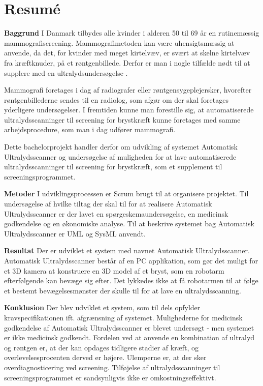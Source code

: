 \chapter{Resumé}
\textbf{Baggrund} \newline
I Danmark tilbydes alle kvinder i alderen 50 til 69 år en rutinemæssig mammografiscreening. Mammografimetoden kan være uhensigtsmæssig at anvende, da det, for kvinder med meget kirtelvæv, er svært at skelne kirtelvæv fra kræftknuder, på et røntgenbillede. Derfor er man i nogle tilfælde nødt til at supplere med en ultralydsundersøgelse \cite{Ultralyd}.

Mammografi foretages i dag af radiografer eller røntgensygeplejersker, hvorefter røntgenbillederne sendes til en radiolog, som afgør om der skal foretages yderligere undersøgelser. I fremtiden kunne man forestille sig, at automatiserede ultralydsscanninger til screening for brystkræft kunne foretages med samme arbejdsprocedure, som man i dag udfører mammografi.

Dette bachelorprojekt handler derfor om udvikling af systemet Automatisk Ultralydsscanner og undersøgelse af muligheden for at lave automatiserede ultralydsscanninger til screening for brystkræft, som et supplement til screeningsprogrammet.

\textbf{Metoder} \newline
I udviklingsprocessen er Scrum brugt til at organisere projektet. Til undersøgelse af hvilke tiltag der skal til for at realisere Automatisk Ultralydsscanner er der lavet en spørgeskemaundersøgelse, en medicinsk godkendelse og en økonomiske analyse. Til at beskrive systemet bag Automatisk Ultralydsscanner er UML og SysML anvendt. 

\textbf{Resultat} \newline
Der er udviklet et system med navnet Automatisk Ultralydsscanner. Automatisk Ultralydsscanner består af en PC applikation, som gør det muligt for et 3D kamera at konstruere en 3D model af et bryst, som en robotarm efterfølgende kan bevæge sig efter. Det lykkedes ikke at få robotarmen til at følge et bestemt bevægelsesmønster der skulle til for at lave en ultralydsscanning. 

\textbf{Konklusion} \newline
Der blev udviklet et system, som til dels opfylder kravspecifikationen ift. afgrænsning af systemet. Mulighederne for medicinsk godkendelse af Automatisk Ultralydsscanner er blevet undersøgt - men systemet er ikke medicinsk godkendt. Fordelen ved at anvende en kombination af ultralyd og røntgen er, at der kan opdages tidligere stadier af kræft, og overlevelsesprocenten derved er højere. Ulemperne er, at der sker overdiagnosticering ved screening. Tilføjelse af ultralydsscanninger til screeningsprogrammet er sandsynligvis ikke er omkostningseffektivt.